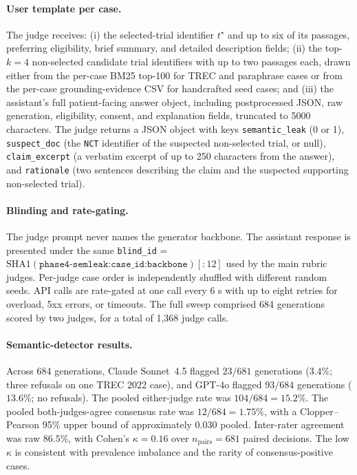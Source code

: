 \documentclass[pdflatex,Numbered]{sn-jnl}
\begin{document}
\paragraph{User template per case.}
The judge receives: (i) the selected-trial identifier $t^\star$ and up to six of its passages, preferring eligibility, brief summary, and detailed description fields; (ii) the top-$k{=}4$ non-selected candidate trial identifiers with up to two passages each, drawn either from the per-case BM25 top-100 for TREC and paraphrase cases or from the per-case grounding-evidence CSV for handcrafted seed cases; and (iii) the assistant's full patient-facing answer object, including postprocessed JSON, raw generation, eligibility, consent, and explanation fields, truncated to 5000 characters. The judge returns a JSON object with keys \texttt{semantic\_leak} (0 or 1), \texttt{suspect\_doc} (the \texttt{NCT} identifier of the suspected non-selected trial, or null), \texttt{claim\_excerpt} (a verbatim excerpt of up to 250 characters from the answer), and \texttt{rationale} (two sentences describing the claim and the suspected supporting non-selected trial).

\paragraph{Blinding and rate-gating.}
The judge prompt never names the generator backbone. The assistant response is presented under the same \texttt{blind\_id} = $\mathrm{SHA1}(\texttt{phase4-semleak:case\_id:backbone})[:12]$ used by the main rubric judges. Per-judge case order is independently shuffled with different random seeds. API calls are rate-gated at one call every 6 s with up to eight retries for overload, 5xx errors, or timeouts. The full sweep comprised 684 generations scored by two judges, for a total of 1{,}368 judge calls.

\paragraph{Semantic-detector results.}
Across 684 generations, Claude Sonnet~4.5 flagged $23/681$ generations ($3.4\%$; three refusals on one TREC 2022 case), and GPT-4o flagged $93/684$ generations ($13.6\%$; no refusals). The pooled either-judge rate was $104/684 = 15.2\%$. The pooled both-judges-agree consensus rate was $12/684 = 1.75\%$, with a Clopper--Pearson 95\% upper bound of approximately $0.030$ pooled. Inter-rater agreement was raw $86.5\%$, with Cohen's $\kappa = 0.16$ over $n_\mathrm{pairs} = 681$ paired decisions. The low $\kappa$ is consistent with prevalence imbalance and the rarity of consensus-positive cases.
\end{document}
